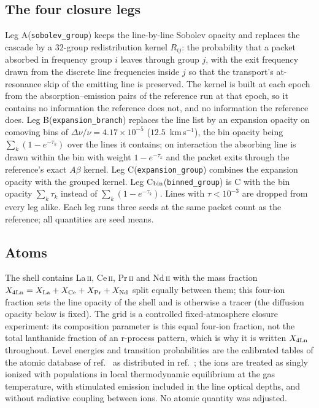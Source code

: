 \documentclass[11pt]{article}
\newcommand{\Cboth}{C\xspace}
\newcommand{\Cbin}{C$_{\rm bin}$\xspace}
\newcommand{\Aleg}{A\xspace}
\newcommand{\Bleg}{B\xspace}
\newcommand{\Xlan}{X_{\rm 4Ln}}
\newcommand{\Rij}{R_{ij}}
\newcommand{\LaII}{La\,\textsc{ii}\xspace}
\newcommand{\CeII}{Ce\,\textsc{ii}\xspace}
\newcommand{\PrII}{Pr\,\textsc{ii}\xspace}
\newcommand{\NdII}{Nd\,\textsc{ii}\xspace}
\begin{document}
\subsection*{The four closure legs}
Leg \Aleg (\texttt{sobolev\_group}) keeps the line-by-line Sobolev opacity and replaces the cascade by a $32$-group redistribution kernel $\Rij$: the probability that a packet absorbed in frequency group $i$ leaves through group $j$, with the exit frequency drawn from the discrete line frequencies inside $j$ so that the transport's at-resonance skip of the emitting line is preserved. The kernel is built at each epoch from the absorption--emission pairs of the reference run at that epoch, so it contains no information the reference does not, and no information the reference does. Leg \Bleg (\texttt{expansion\_branch}) replaces the line list by an expansion opacity on comoving bins of $\Delta\nu/\nu=4.17\times10^{-5}$ ($12.5$~km\,s$^{-1}$), the bin opacity being $\sum_k(1-e^{-\tau_k})$ over the lines it contains; on interaction the absorbing line is drawn within the bin with weight $1-e^{-\tau_k}$ and the packet exits through the reference's exact $A\beta$ kernel. Leg \Cboth (\texttt{expansion\_group}) combines the expansion opacity with the grouped kernel. Leg \Cbin (\texttt{binned\_group}) is \Cboth with the bin opacity $\sum_k\tau_k$ instead of $\sum_k(1-e^{-\tau_k})$. Lines with $\tau<10^{-3}$ are dropped from every leg alike. Each leg runs three seeds at the same packet count as the reference; all quantities are seed means.

\subsection*{Atoms}
The shell contains \LaII, \CeII, \PrII and \NdII with the mass fraction $\Xlan = X_{\rm La}+X_{\rm Ce}+X_{\rm Pr}+X_{\rm Nd}$ split equally between them; this four-ion fraction sets the line opacity of the shell and is otherwise a tracer (the diffusion opacity below is fixed). The grid is a controlled fixed-atmosphere closure experiment: its composition parameter is this equal four-ion fraction, not the total lanthanide fraction of an r-process pattern, which is why it is written $\Xlan$ throughout. Level energies and transition probabilities are the calibrated tables of the atomic database of ref.~\cite{gsi_atomic} as distributed in ref.~\cite{gsi_zenodo}; the ions are treated as singly ionized with populations in local thermodynamic equilibrium at the gas temperature, with stimulated emission included in the line optical depths, and without radiative coupling between ions. No atomic quantity was adjusted.
\end{document}

